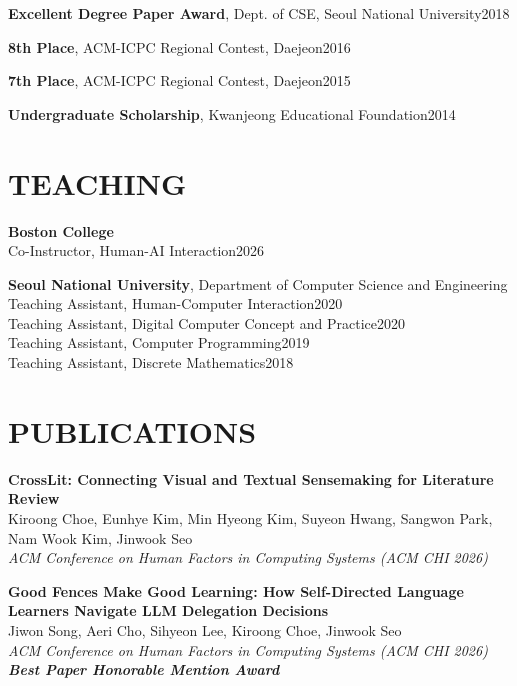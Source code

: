\documentclass[margin]{res}
\begin{document}
\begin{resume}
\textbf{Excellent Degree Paper Award}, Dept. of CSE, Seoul National University\hfill 2018

\textbf{8th Place}, ACM-ICPC Regional Contest, Daejeon\hfill 2016

\textbf{7th Place}, ACM-ICPC Regional Contest, Daejeon\hfill 2015

\textbf{Undergraduate Scholarship}, Kwanjeong Educational Foundation\hfill 2014


\section{TEACHING}

\textbf{Boston College}\\
Co-Instructor, Human-AI Interaction\hfill 2026

\textbf{Seoul National University}, Department of Computer Science and Engineering\\
Teaching Assistant, Human-Computer Interaction\hfill 2020\\
Teaching Assistant, Digital Computer Concept and Practice\hfill 2020\\
Teaching Assistant, Computer Programming\hfill 2019\\
Teaching Assistant, Discrete Mathematics\hfill 2018


\section{PUBLICATIONS}

\par
\textbf{CrossLit: Connecting Visual and Textual Sensemaking for Literature Review}\\
Kiroong Choe, Eunhye Kim, Min Hyeong Kim, Suyeon Hwang, Sangwon Park, Nam Wook Kim, Jinwook Seo\\
\textit{ACM Conference on Human Factors in Computing Systems (ACM CHI 2026)}

\par
\textbf{Good Fences Make Good Learning: How Self-Directed Language Learners Navigate LLM Delegation Decisions}\\
Jiwon Song, Aeri Cho, Sihyeon Lee, Kiroong Choe, Jinwook Seo\\
\textit{ACM Conference on Human Factors in Computing Systems (ACM CHI 2026)}\\
\textbf{\textit{Best Paper Honorable Mention Award}}


\end{resume}
\end{document}
